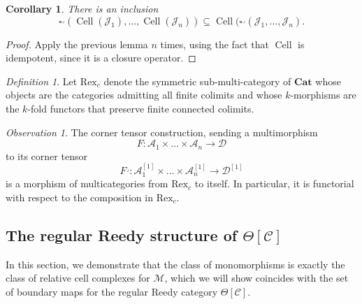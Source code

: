 \documentclass[leqno]{article}
\numberwithin{equation}{subsection}
\theoremstyle{plain}   %
\newtheorem{cor}[equation]{Corollary}
\theoremstyle{remark}
\newtheorem{obs}[equation]{Observation}
\newtheorem{defn}[equation]{Definition}
\theoremstyle{plain}
\newcommand{\Cat}{\ensuremath{\mathbf{Cat}}}
\newcommand{\C}{\ensuremath{\mathcal{C}}}
\begin{document}
\begin{cor} 
	There is an inclusion
	\[\square^\lrcorner(\operatorname{Cell}(\mathscr{J}_1),\dots,\operatorname{Cell}(\mathscr{J}_n)) \subseteq \operatorname{Cell}(\square^\lrcorner(\mathscr{J}_1,\dots,\mathscr{J}_n).\]
\end{cor}
\begin{proof} 
	Apply the previous lemma \(n\) times, using the fact that \(\operatorname{Cell}\) is idempotent, since it is a closure operator.
\end{proof}

\begin{defn} Let \(\mathrm{Rex}_c\) denote the symmetric sub-multi-category of \(\Cat\) whose objects are the categories admitting all finite colimits and whose \(k\)-morphisms are the \(k\)-fold functors that preserve finite connected colimits.
\end{defn}
\begin{obs}\label{cornertensorfunctoriality} The corner tensor construction, sending a multimorphism 
	\[F:\mathcal{A}_1\times\dots\times \mathcal{A}_n \to \mathcal{D}\] to its corner tensor
	\[F^\lrcorner:\mathcal{A}_1^{[1]}\times\dots\times \mathcal{A}_n^{[1]} \to \mathcal{D}^{[1]}\] is a morphism of multicategories from \(\mathrm{Rex}_c\) to itself.  In particular, it is functorial with respect to the composition in \(\mathrm{Rex}_c\).
\end{obs}
\subsection{The regular Reedy structure of \(\Theta[\C]\)}\label{reedy}
In this section, we demonstrate that the class of monomorphisms is exactly the class of relative cell complexes for \(\mathscr{M}\), which we will show coincides with the set of boundary maps for the regular Reedy category \(\Theta[\C]\).  
\end{document}
